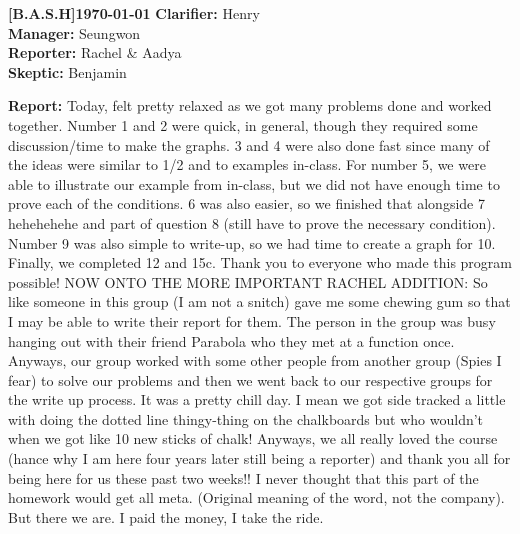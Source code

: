 \documentclass[11pt]{article}
\newcommand{\teamname}{[B.A.S.H]}
\newcommand{\reportdate}{\today}
\begin{document}
\thispagestyle{firstpage}

\noindent\textbf{\teamname}\hfill\textbf{\reportdate}
\noindent\textbf{Clarifier:} Henry\\
\textbf{Manager:} Seungwon\\
\textbf{Reporter:} Rachel \& Aadya\\
\textbf{Skeptic:} Benjamin

\textbf{Report:} Today, felt pretty relaxed as we got many problems done and worked together. Number 1 and 2 were quick, in general, though they required some discussion/time to make the graphs. 3 and 4 were also done fast since many of the ideas were similar to 1/2 and to examples in-class. For number 5, we were able to illustrate our example from in-class, but we did not have enough time to prove each of the conditions. 6 was also easier, so we finished that alongside 7 \color{blue} hehehehehe \color{black} and part of question 8 (still have to prove the necessary condition). Number 9 was also simple to write-up, so we had time to create a graph for 10. Finally, we completed 12 and 15c. Thank you to everyone who made this program possible!  
\newline NOW ONTO THE MORE IMPORTANT RACHEL ADDITION: 
\newline So like someone in this group (I am not a snitch) gave me some chewing gum so that I may be able to write their report for them. The person in the group was busy hanging out with their friend Parabola who they met at a function once. Anyways, our group worked with some other people from another group (Spies I fear) to solve our problems and then we went back to our respective groups for the write up process. It was a pretty chill day. I mean we got side tracked a little with doing the dotted line thingy-thing on the chalkboards but who wouldn't when we got like 10 new sticks of chalk! Anyways, we all really loved the course (hance why I am here four years later still being a reporter) and thank you all for being here for us these past two weeks!!
\color{djs} I never thought that this part of the homework would get all meta. (Original meaning of the word, not the company).  But there we are. I paid the money, I take the ride. \color{black}


\end{document}
